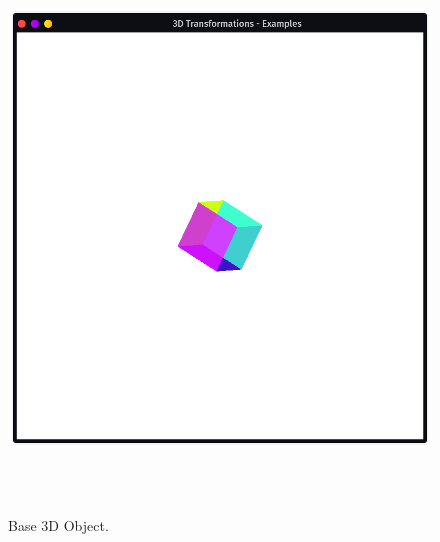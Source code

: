 \documentclass[12pt, a4]{article}
\begin{document}
\subsection*{}
\begin{figure}[h]
\centering
\caption{Base 3D Object.}
\includegraphics[height=15cm, width=15cm]{Outputs/Output-0.png}
\end{figure}

\newpage
\end{document}

